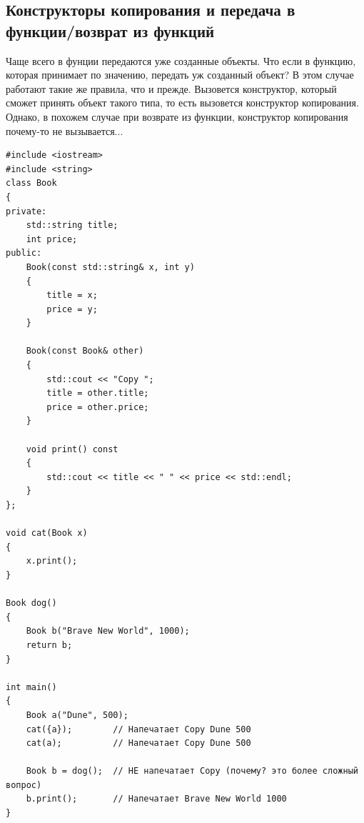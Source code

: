 \documentclass{article}
\begin{document}
\subsection*{Конструкторы копирования и передача в функции/возврат из функций}
Чаще всего в фунции передаются уже созданные объекты. Что если в функцию, которая принимает по значению, передать уж созданный объект? В этом случае работают такие же правила, что и прежде. Вызовется конструктор, который сможет принять объект такого типа, то есть вызовется конструктор копирования. Однако, в похожем случае при возврате из функции, конструктор копирования почему-то не вызывается...
\begin{lstlisting}
#include <iostream>
#include <string>
class Book 
{
private:
    std::string title;
    int price;
public:
    Book(const std::string& x, int y)
    {
        title = x;
        price = y;
    }
    
    Book(const Book& other)
    {
        std::cout << "Copy ";
        title = other.title;
        price = other.price;
    }
    
    void print() const
    {
        std::cout << title << " " << price << std::endl;
    }
};

void cat(Book x)
{
    x.print();
}

Book dog()
{
    Book b("Brave New World", 1000);
    return b;
}

int main() 
{
    Book a("Dune", 500);
    cat({a});        // Напечатает Copy Dune 500
    cat(a);          // Напечатает Copy Dune 500
    
    Book b = dog();  // НЕ напечатает Copy (почему? это более сложный вопрос)
    b.print();       // Напечатает Brave New World 1000
}
\end{lstlisting}


\newpage
\end{document}
